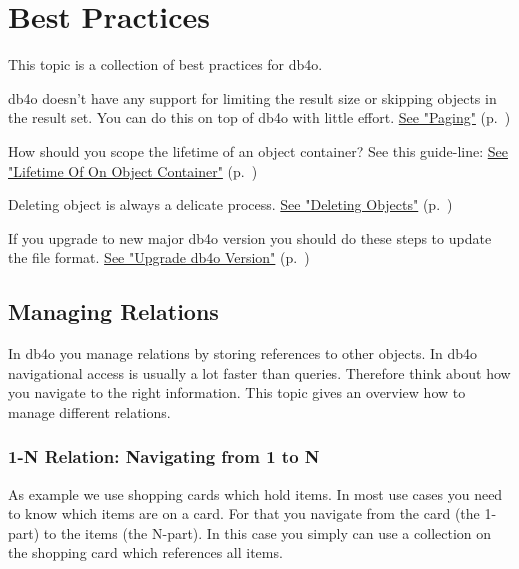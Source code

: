 
\chapter{Best Practices}
\label{ref:best-practises}

This topic is a collection of best practices for db4o.

db4o doesn't have any support for limiting the result size or skipping objects in the result set. You can do this on top of db4o with little effort. \hyperref[ref:best-practises-paging]{See "Paging"} (p.~\pageref{ref:best-practises-paging})

How should you scope the lifetime of an object container? See this guide-line: \hyperref[ref:best-practises-lifetime-of-a-objectcontainer]{See "Lifetime Of On Object Container"} (p.~\pageref{ref:best-practises-lifetime-of-a-objectcontainer})

Deleting object is always a delicate process. \hyperref[ref:best-practises-deleting-objects]{See "Deleting Objects"} (p.~\pageref{ref:best-practises-deleting-objects})

If you upgrade to new major db4o version you should do these steps to update the file format. \hyperref[ref:best-practises-updating-db4o-version]{See "Upgrade db4o Version"} (p.~\pageref{ref:best-practises-updating-db4o-version})

\section{Managing Relations}
\label{ref:best-practises-managing-relations}

In db4o you manage relations by storing references to other objects. In db4o navigational access is usually a lot faster than queries. Therefore think about how you navigate to the right information. This topic gives an overview how to manage different relations.

\subsection{1-N Relation: Navigating from 1 to N}
\label{ref:best-practises-managing-relations:1ton-nav}

As example we use shopping cards which hold items. In most use cases you need to know which items are on a card. For that you navigate from the card (the 1-part) to the items (the N-part). In this case you simply can use a collection on the shopping card which references all items.

